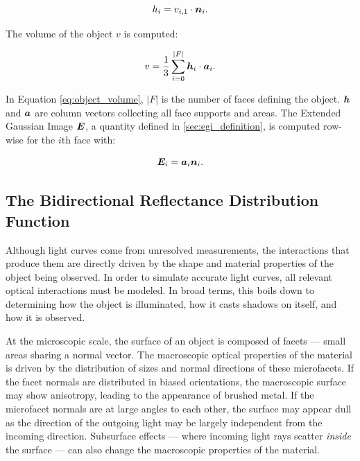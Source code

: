 \begin{equation} \label{eq:face_support}
    h_i = v_{i,1} \cdot \bm{n}_i.
\end{equation}

The volume of the object $v$ is computed:

\begin{equation} \label{eq:object_volume}
    v = \frac{1}{3} \sum_{i=0}^{ \lvert F \rvert}\bm{h}_i \cdot \bm{a}_i.
\end{equation}

In Equation \ref{eq:object_volume}, $\lvert F \rvert$ is the number of faces defining the object. $\bm{h}$ and $\bm{a}$ are column vectors collecting all face supports and areas. The Extended Gaussian Image $\bm{E}$, a quantity defined in \ref{sec:egi_definition}, is computed row-wise for the $i$th face with:

\begin{equation} \label{eq:egi_definition}
    \bm{E}_i = \bm{a}_i \bm{n}_i.
\end{equation}

\subsection{The Bidirectional Reflectance Distribution Function}

Although light curves come from unresolved measurements, the interactions that produce them are directly driven by the shape and material properties of the object being observed. In order to simulate accurate light curves, all relevant optical interactions must be modeled. In broad terms, this boils down to determining how the object is illuminated, how it casts shadows on itself, and how it is observed. 

At the microscopic scale, the surface of an object is composed of facets ---  small areas sharing a normal vector. The macroscopic optical properties of the material is driven by the distribution of sizes and normal directions of these microfacets. If the facet normals are distributed in biased orientations, the macroscopic surface may show anisotropy, leading to the appearance of brushed metal. If the microfacet normals are at large angles to each other, the surface may appear dull as the direction of the outgoing light may be largely independent from the incoming direction. Subsurface effects ---  where incoming light rays scatter \textit{inside} the surface --- can also change the macroscopic properties of the material. 

